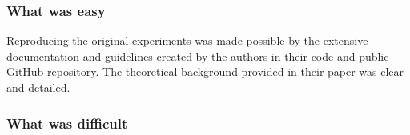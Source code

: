 
\subsubsection*{What was easy}


Reproducing the original experiments was made possible by the extensive documentation and guidelines created by the authors in their code and public GitHub repository. The theoretical background provided in their paper was clear and detailed.




\subsubsection*{What was difficult}


